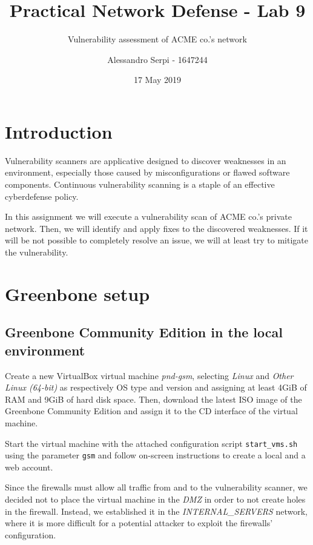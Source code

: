 \documentclass[draft]{homework}
\title{Practical Network Defense - Lab 9}
\subtitle{Vulnerability assessment of ACME co.'s network}
\author{Alessandro Serpi - 1647244}
\date{17 May 2019}
\begin{document}
    \maketitle
    \tableofcontents
    
    
    \pagebreak
    \section{Introduction}
    Vulnerability scanners are applicative designed to discover weaknesses in an environment, especially those caused by misconfigurations or flawed software components.
    Continuous vulnerability scanning is a staple of an effective cyberdefense policy.
    
    In this assignment we will execute a vulnerability scan of ACME co.'s private network.
    Then,  we will identify and apply fixes to the discovered weaknesses.
    If it will be not possible to completely resolve an issue, we will at least try to mitigate the vulnerability.
    
    
    \section{Greenbone setup}
    \subsection{Greenbone Community Edition in the local environment}
    Create a new VirtualBox virtual machine \textit{pnd-gsm}, selecting \textit{Linux} and \textit{Other Linux (64-bit)} as respectively OS type and version and assigning at least 4GiB of RAM and 9GiB of hard disk space.
    Then, download the latest ISO image of the Greenbone Community Edition and assign it to the CD interface of the virtual machine.
    
    Start the virtual machine with the attached configuration script \texttt{start\_vms.sh} using the parameter \texttt{gsm} and follow on-screen instructions to create a local and a web account.
    
    Since the firewalls must allow all traffic from and to the vulnerability scanner, we decided not to place the virtual machine in the \textit{DMZ} in order to not create holes in the firewall.
    Instead, we established it in the \textit{INTERNAL\_SERVERS} network, where it is more difficult for a potential attacker to exploit the firewalls' configuration.
    
\end{document}
